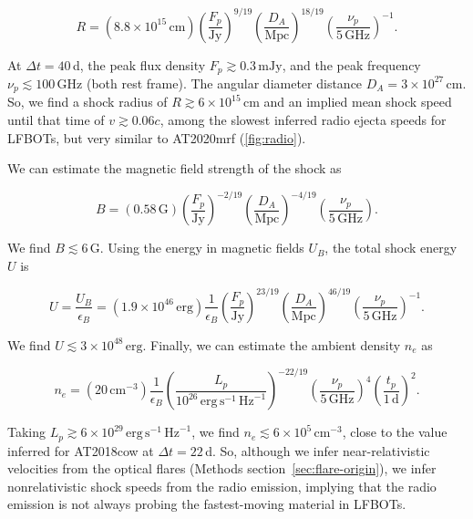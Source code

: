 \documentclass{nature_plusfigure}
\begin{document}
\begin{methods}
\begin{equation}
    R = (8.8 \times 10^{15}\,\mathrm{cm}) \left(\frac{F_p}{\mathrm{Jy}}\right)^{9/19} \left(\frac{D_A}{\mathrm{Mpc}}\right)^{18/19} \left(\frac{\nu_p}{5\,\mathrm{GHz}}\right)^{-1}.
\end{equation}

\noindent At $\Delta t=40\,$d, the peak flux density $F_p\gtrsim0.3\,\mathrm{mJy}$, and the peak frequency $\nu_p\lesssim100\,\mathrm{GHz}$ (both rest frame). The angular diameter distance $D_A=3\times10^{27}\,\mathrm{cm}$. So, we find a shock radius of $R\gtrsim6\times10^{15}\,$cm and an implied mean shock speed until that time of $v\gtrsim0.06c$, among the slowest inferred radio ejecta speeds for LFBOTs, but very similar to AT2020mrf\cite{Yao2022} (\ref{fig:radio}). 

We can estimate the magnetic field strength of the shock as\cite{Chevalier1998}

\begin{equation}
    B = (0.58\,\mathrm{G}) \left(\frac{F_p}{\mathrm{Jy}}\right)^{-2/19} \left(\frac{D_A}{\mathrm{Mpc}}\right)^{-4/19} \left(\frac{\nu_p}{5\,\mathrm{GHz}}\right).
\end{equation}

\noindent We find $B \lesssim 6\,$G. Using the energy in magnetic fields $U_B$, the total shock energy $U$ is\cite{Ho2019}

\begin{equation}
    U = \frac{U_B}{\epsilon_B} = (1.9 \times 10^{46}\,\mathrm{erg}) \frac{1}{\epsilon_B} 
    \left(\frac{F_p}{\mathrm{Jy}}\right)^{23/19} \left(\frac{D_A}{\mathrm{Mpc}}\right)^{46/19} \left(\frac{\nu_p}{5\,\mathrm{GHz}}\right)^{-1}.
\end{equation}

\noindent We find $U\lesssim 3\times10^{48}\,\mathrm{erg}$. Finally, we can estimate the ambient density $n_e$ as\cite{Ho2019}

\begin{equation}
    n_e = (20\,\mathrm{cm}^{-3}) \frac{1}{\epsilon_B} \left(\frac{L_p}{10^{26}\,\mathrm{erg}\,\mathrm{s}^{-1}\,\mathrm{Hz}^{-1}}\right)^{-22/19} 
    \left(\frac{\nu_p}{5\,\mathrm{GHz}}\right)^{4}
    \left(\frac{t_p}{1\,\mathrm{d}}\right)^{2}.
\end{equation}

\noindent Taking $L_p\gtrsim6\times10^{29}\,\mathrm{erg}\,\mathrm{s}^{-1}\,\mathrm{Hz}^{-1}$, we find $n_e\lesssim 6\times10^{5}\,\mathrm{cm}^{-3}$, close to the value inferred for AT2018cow at $\Delta t=22\,$d\cite{Ho2019}.
So, although we infer near-relativistic velocities from the optical flares (Methods section~\ref{sec:flare-origin}), we infer nonrelativistic shock speeds from the radio emission, implying that the radio emission is not always probing the fastest-moving material in LFBOTs. %


\end{methods}
\end{document}
